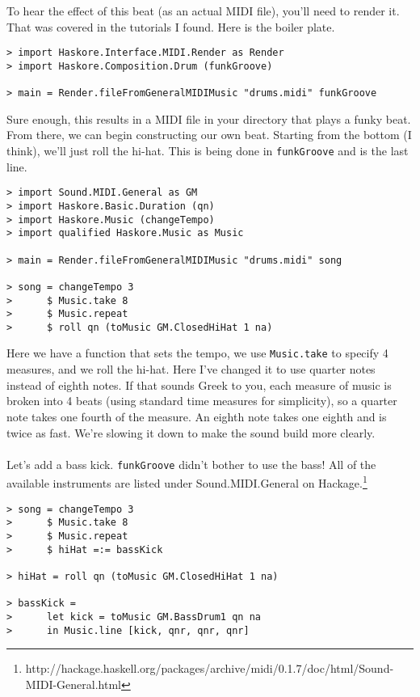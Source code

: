 \documentclass{article}
\begin{document}
\pagebreak

To hear the effect of this beat (as an actual MIDI file), you'll need to render
it. That was covered in the tutorials I found. Here is the boiler plate.
\begin{lstlisting}
> import Haskore.Interface.MIDI.Render as Render
> import Haskore.Composition.Drum (funkGroove)

> main = Render.fileFromGeneralMIDIMusic "drums.midi" funkGroove
\end{lstlisting}
Sure enough, this results in a MIDI file in your directory that plays a funky
beat. From there, we can begin constructing our own beat. Starting from the
bottom (I think), we'll just roll the hi-hat. This is being done in 
\lstinline{funkGroove} and is the last line.

\begin{lstlisting}
> import Sound.MIDI.General as GM
> import Haskore.Basic.Duration (qn)
> import Haskore.Music (changeTempo)
> import qualified Haskore.Music as Music

> main = Render.fileFromGeneralMIDIMusic "drums.midi" song

> song = changeTempo 3
>      $ Music.take 8
>      $ Music.repeat
>      $ roll qn (toMusic GM.ClosedHiHat 1 na)
\end{lstlisting}
Here we have a function that sets the tempo, we use \lstinline{Music.take}
to specify 4 measures, and we roll the hi-hat. Here I've changed it to use
quarter notes instead of eighth notes. If that sounds Greek to you, each measure
of music is broken into 4 beats (using standard time measures for simplicity),
so a quarter note takes one fourth of the measure. An eighth note takes one
eighth and is twice as fast. We're slowing it down to make the sound build
more clearly.\\
\\
\indent Let's add a bass kick. \lstinline{funkGroove} didn't bother to use the bass!
All of the available instruments are listed under Sound.MIDI.General on 
Hackage.\footnote{http://hackage.haskell.org/packages/archive/midi/0.1.7/doc/html/Sound-MIDI-General.html}
\begin{lstlisting}
> song = changeTempo 3
>      $ Music.take 8
>      $ Music.repeat
>      $ hiHat =:= bassKick

> hiHat = roll qn (toMusic GM.ClosedHiHat 1 na)

> bassKick =
>      let kick = toMusic GM.BassDrum1 qn na
>      in Music.line [kick, qnr, qnr, qnr]
\end{lstlisting}
\end{document}
